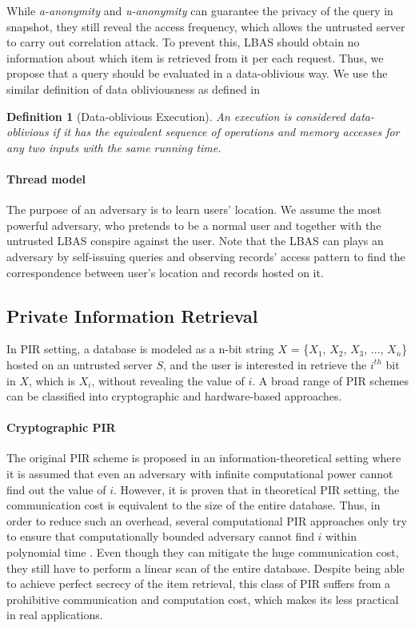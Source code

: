 While \textit{a-anonymity} and \textit{u-anonymity} can guarantee the privacy of the query in snapshot, they still reveal the access frequency, which allows the untrusted server to carry out correlation attack\cite{Spiral}. To prevent this, LBAS should obtain no information about which item is retrieved from it per each request. Thus, we propose that a query should be evaluated in a data-oblivious way. We use the similar definition of data obliviousness as defined in \cite{ORAM}

\newtheorem{obliviousness}[defi]{Definition}
\begin{obliviousness}
[Data-oblivious Execution] 
An execution is considered data-oblivious if it has the equivalent sequence of operations and memory accesses for any two inputs with the same running time.
\end{obliviousness}


\paragraph{Thread model}
The purpose of an adversary is to learn users' location. We assume the most powerful adversary, who pretends to be a normal user and together with the untrusted LBAS conspire against the user. Note that the LBAS can plays an adversary by self-issuing queries and observing records' access pattern to find the correspondence between user's location and records hosted on it.

\subsection{Private Information Retrieval}
\label{backgroundPIR}
In PIR setting, a database is modeled as a n-bit string $X$ = \{$X_1$, $X_2$, $X_3$, ..., $X_n$\} hosted on an untrusted server $S$, and the user is interested in retrieve the $i^{th}$ bit in $X$, which is $X_i$, without revealing the value of $i$. A broad range of PIR schemes can be classified into cryptographic and hardware-based approaches. 

\paragraph{Cryptographic PIR}
The original PIR scheme is proposed in an information-theoretical setting where it is assumed that even an adversary with infinite computational power cannot find out the value of $i$. However, it is proven that in theoretical PIR setting, the communication cost is equivalent to the size of the entire database. Thus, in order to reduce such an overhead, several computational PIR approaches only try to ensure that computationally bounded adversary cannot find $i$ within polynomial time \cite{computational_PIR}. Even though they can mitigate the huge communication cost, they still have to perform a linear scan of the entire database. Despite being able to achieve perfect secrecy of the item retrieval, this class of PIR suffers from a prohibitive communication and computation cost, which makes its less practical in real applications.

